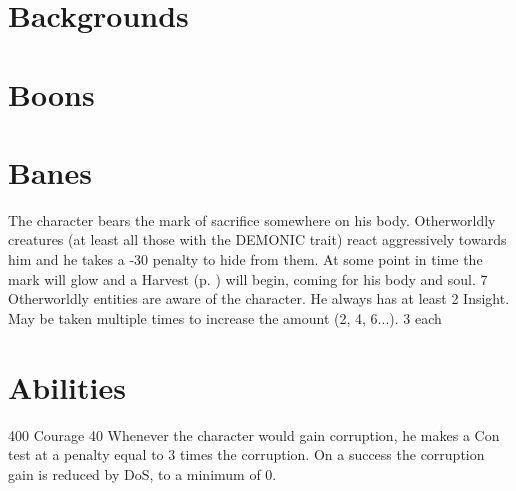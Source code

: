 \section{Backgrounds}
\label{sec:backgroundlist}

\section{Boons}
\section{Banes}
	{The character bears the mark of sacrifice somewhere on his body.
		Otherworldly creatures (at least all those with the DEMONIC trait)
		react aggressively towards him
		and he takes a -30 penalty to hide from them.
		At some point in time the mark will glow and a Harvest (p. \pageref{anomaly:harvest}) will begin,
		coming for his body and soul.
	}
	{7}
	{}
	{Otherworldly entities are aware of the character.
		He always has at least 2 Insight.
		May be taken multiple times to increase the amount (2, 4, 6...).}
	{3}
	{each}
\section{Abilities}
	{400}
	{Courage 40}
	{Whenever the character would gain corruption,
		he makes a Con test at a penalty
		equal to 3 times the corruption.
		On a success the corruption gain is reduced by DoS, to a minimum of 0.}
\pagebreak%
